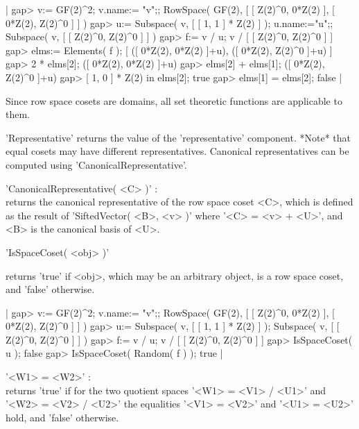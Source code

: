 |    gap> v:= GF(2)^2; v.name:= "v";;
    RowSpace( GF(2), [ [ Z(2)^0, 0*Z(2) ], [ 0*Z(2), Z(2)^0 ] ] )
    gap> u:= Subspace( v, [ [ 1, 1 ] * Z(2) ] ); u.name:="u";;
    Subspace( v, [ [ Z(2)^0, Z(2)^0 ] ] )
    gap> f:= v / u;
    v / [ [ Z(2)^0, Z(2)^0 ] ]
    gap> elms:= Elements( f );
    [ ([ 0*Z(2), 0*Z(2) ]+u), ([ 0*Z(2), Z(2)^0 ]+u) ]
    gap> 2 * elms[2];
    ([ 0*Z(2), 0*Z(2) ]+u)
    gap> elms[2] + elms[1];
    ([ 0*Z(2), Z(2)^0 ]+u)
    gap> [ 1, 0 ] * Z(2) in elms[2];
    true
    gap> elms[1] = elms[2];
    false |
    


Since row space cosets are domains, all set theoretic functions are
applicable to them.

'Representative'
    returns the value of the 'representative' component.  *Note* that equal
    cosets may have different representatives.  Canonical representatives
    can be computed using 'CanonicalRepresentative'.

'CanonicalRepresentative( <C> )' : \\
    returns the canonical representative of the row space coset <C>,
    which is defined as the result of 'SiftedVector( <B>, <v> )' where
    '<C> = <v> + <U>', and <B> is the canonical basis of <U>.


'IsSpaceCoset( <obj> )'

returns 'true' if <obj>, which may be an arbitrary object, is a row space
coset, and 'false' otherwise.

|    gap> v:= GF(2)^2; v.name:= "v";;
    RowSpace( GF(2), [ [ Z(2)^0, 0*Z(2) ], [ 0*Z(2), Z(2)^0 ] ] )
    gap> u:= Subspace( v, [ [ 1, 1 ] * Z(2) ] );
    Subspace( v, [ [ Z(2)^0, Z(2)^0 ] ] )
    gap> f:= v / u;
    v / [ [ Z(2)^0, Z(2)^0 ] ]
    gap> IsSpaceCoset( u );
    false
    gap> IsSpaceCoset( Random( f ) );
    true |


'<W1> = <W2>' : \\
    returns 'true' if for the two quotient spaces '<W1> = <V1> / <U1>' and
    '<W2> = <V2> / <U2>' the equalities '<V1> = <V2>' and '<U1> = <U2>'
    hold, and 'false' otherwise.

